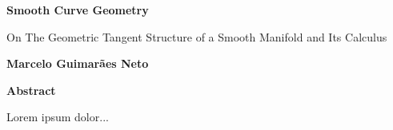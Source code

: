 \thispagestyle{plain}
\begin{center}
    \Large
    \textbf{Smooth Curve Geometry}
        
    \vspace{0.4cm}
    \large
    On The Geometric Tangent Structure of a Smooth Manifold and Its Calculus
        
    \vspace{0.4cm}
    \textbf{Marcelo Guimarães Neto}
       
    \vspace{0.9cm}
    \textbf{Abstract}
\end{center}
Lorem ipsum dolor...